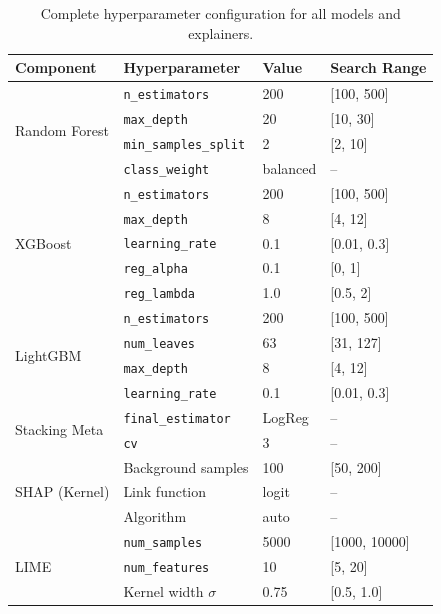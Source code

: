 \documentclass[conference]{IEEEtran}
\begin{document}
\begin{table}[htbp]
\centering
\caption{Complete hyperparameter configuration for all models and explainers.}
\label{tab:hyperparams}
\renewcommand{\arraystretch}{1.1}
\begin{tabular}{llll}
\toprule
\textbf{Component} & \textbf{Hyperparameter} & \textbf{Value} & \textbf{Search Range} \\
\midrule
\multirow{4}{*}{Random Forest}
  & \texttt{n\_estimators}  & 200  & [100, 500] \\
  & \texttt{max\_depth}     & 20   & [10, 30]   \\
  & \texttt{min\_samples\_split} & 2 & [2, 10] \\
  & \texttt{class\_weight}  & balanced & -- \\
\midrule
\multirow{5}{*}{XGBoost}
  & \texttt{n\_estimators}  & 200  & [100, 500] \\
  & \texttt{max\_depth}     & 8    & [4, 12]    \\
  & \texttt{learning\_rate} & 0.1  & [0.01, 0.3] \\
  & \texttt{reg\_alpha}     & 0.1  & [0, 1]     \\
  & \texttt{reg\_lambda}    & 1.0  & [0.5, 2]   \\
\midrule
\multirow{4}{*}{LightGBM}
  & \texttt{n\_estimators}  & 200  & [100, 500] \\
  & \texttt{num\_leaves}    & 63   & [31, 127]  \\
  & \texttt{max\_depth}     & 8    & [4, 12]    \\
  & \texttt{learning\_rate} & 0.1  & [0.01, 0.3] \\
\midrule
\multirow{2}{*}{Stacking Meta}
  & \texttt{final\_estimator} & LogReg & -- \\
  & \texttt{cv}             & 3    & -- \\
\midrule
\multirow{3}{*}{SHAP (Kernel)}
  & Background samples      & 100  & [50, 200]  \\
  & Link function           & logit & -- \\
  & Algorithm               & auto  & -- \\
\midrule
\multirow{3}{*}{LIME}
  & \texttt{num\_samples}   & 5000 & [1000, 10000] \\
  & \texttt{num\_features}  & 10   & [5, 20]    \\
  & Kernel width $\sigma$   & 0.75 & [0.5, 1.0] \\
\bottomrule
\end{tabular}
\end{table}
\end{document}
